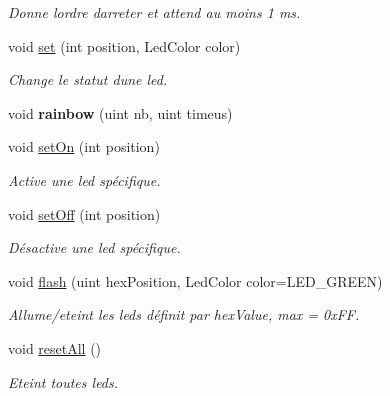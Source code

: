 \begin{DoxyCompactItemize}
\begin{DoxyCompactList}\small\item\em Donne l\textquotesingle{}ordre d\textquotesingle{}arreter et attend au moins 1 ms. \end{DoxyCompactList}\item 
void \hyperlink{classLedBar_a4f6f26d47d0ea82380cebb8c2b9ea7c3}{set} (int position, Led\+Color color)
\begin{DoxyCompactList}\small\item\em Change le statut d\textquotesingle{}une led. \end{DoxyCompactList}\item 
\mbox{\label{classLedBar_a7bb1b0cf26c7202807bdc3e68e1f2e48}} 
void {\bfseries rainbow} (uint nb, uint timeus)
\item 
void \hyperlink{classLedBar_aebfc6c5221a223364044fc5c6efacd7a}{set\+On} (int position)
\begin{DoxyCompactList}\small\item\em Active une led spécifique. \end{DoxyCompactList}\item 
void \hyperlink{classLedBar_a3069414fedb0a97740ffd3ff819d63f1}{set\+Off} (int position)
\begin{DoxyCompactList}\small\item\em Désactive une led spécifique. \end{DoxyCompactList}\item 
\mbox{\label{classLedBar_a31ff074dd2184f11b0fc4858542a8050}} 
void \hyperlink{classLedBar_a31ff074dd2184f11b0fc4858542a8050}{flash} (uint hex\+Position, Led\+Color color=L\+E\+D\+\_\+\+G\+R\+E\+EN)
\begin{DoxyCompactList}\small\item\em Allume/eteint les leds définit par hex\+Value, max = 0x\+FF. \end{DoxyCompactList}\item 
\mbox{\label{classLedBar_aa771bd13ff72b872ec4c34e9ef68ea1b}} 
void \hyperlink{classLedBar_aa771bd13ff72b872ec4c34e9ef68ea1b}{reset\+All} ()
\begin{DoxyCompactList}\small\item\em Eteint toutes leds. \end{DoxyCompactList}\item 
\mbox{\label{classLedBar_ad91d62f821e6b1eb6689a0d23f021097}} 

\end{DoxyCompactItemize}
